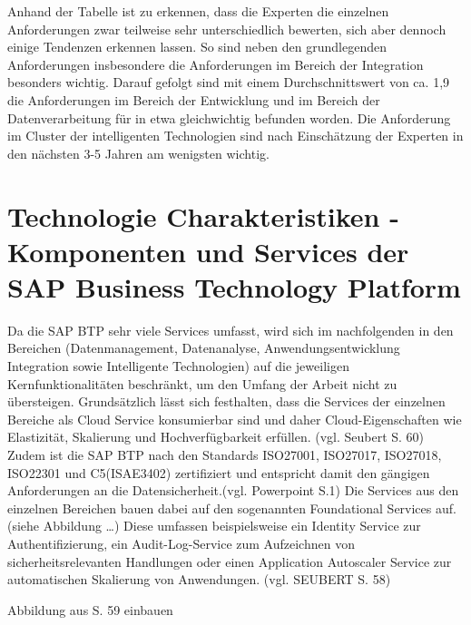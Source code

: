 Anhand der Tabelle ist zu erkennen, dass die Experten die einzelnen Anforderungen zwar teilweise sehr unterschiedlich bewerten, sich aber dennoch einige Tendenzen erkennen lassen. So sind neben den grundlegenden Anforderungen insbesondere die Anforderungen im Bereich der Integration besonders wichtig. Darauf gefolgt sind mit einem Durchschnittswert von ca. 1,9 die Anforderungen im Bereich der Entwicklung und im Bereich der Datenverarbeitung für in etwa gleichwichtig befunden worden. Die Anforderung im Cluster der intelligenten Technologien sind nach Einschätzung der Experten in den nächsten 3-5 Jahren am wenigsten wichtig.















\section{Technologie Charakteristiken - Komponenten und Services der SAP Business Technology Platform}\label{sec:TechCharak}

Da die SAP BTP sehr viele Services umfasst, wird sich im nachfolgenden in den Bereichen (Datenmanagement, Datenanalyse, Anwendungsentwicklung Integration sowie Intelligente Technologien) auf die jeweiligen Kernfunktionalitäten beschränkt, um den Umfang der Arbeit nicht zu übersteigen. Grundsätzlich lässt sich festhalten, dass die Services der einzelnen Bereiche als Cloud Service konsumierbar sind und daher Cloud-Eigenschaften wie Elastizität, Skalierung und Hochverfügbarkeit erfüllen. (vgl. Seubert S. 60) Zudem ist die SAP BTP nach den Standards ISO27001, ISO27017, ISO27018, ISO22301 und C5(ISAE3402) zertifiziert und entspricht damit den gängigen Anforderungen an die Datensicherheit.(vgl. Powerpoint S.1) Die Services aus den einzelnen Bereichen bauen dabei auf den sogenannten Foundational Services auf.(siehe Abbildung …) Diese umfassen beispielsweise ein Identity Service zur Authentifizierung, ein Audit-Log-Service zum Aufzeichnen von sicherheitsrelevanten Handlungen oder einen Application Autoscaler Service zur automatischen Skalierung von Anwendungen. (vgl. SEUBERT S. 58)

Abbildung aus S. 59 einbauen

